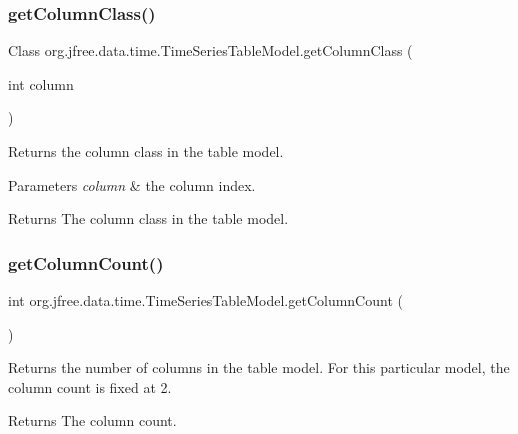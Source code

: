 \subsubsection{\texorpdfstring{get\+Column\+Class()}{getColumnClass()}}
{\footnotesize\ttfamily Class org.\+jfree.\+data.\+time.\+Time\+Series\+Table\+Model.\+get\+Column\+Class (\begin{DoxyParamCaption}\item[{int}]{column }\end{DoxyParamCaption})}

Returns the column class in the table model.


\begin{DoxyParams}{Parameters}
{\em column} & the column index.\\
\hline
\end{DoxyParams}
\begin{DoxyReturn}{Returns}
The column class in the table model. 
\end{DoxyReturn}
\mbox{\label{classorg_1_1jfree_1_1data_1_1time_1_1_time_series_table_model_a44554c6ac3a714a712f1d1869aeeefaa}} 
\subsubsection{\texorpdfstring{get\+Column\+Count()}{getColumnCount()}}
{\footnotesize\ttfamily int org.\+jfree.\+data.\+time.\+Time\+Series\+Table\+Model.\+get\+Column\+Count (\begin{DoxyParamCaption}{ }\end{DoxyParamCaption})}

Returns the number of columns in the table model. For this particular model, the column count is fixed at 2.

\begin{DoxyReturn}{Returns}
The column count. 
\end{DoxyReturn}
\mbox{\label{classorg_1_1jfree_1_1data_1_1time_1_1_time_series_table_model_a52b4391901d138d134b3d1b236dcdb09}} 
